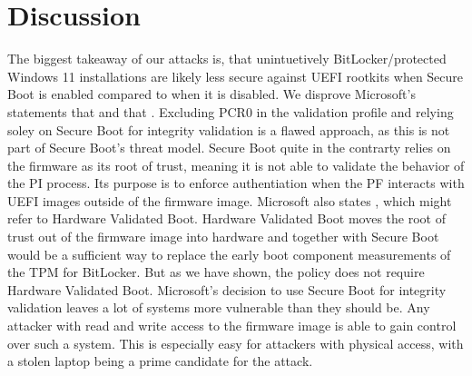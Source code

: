 


\chapter{Discussion}

The biggest takeaway of our attacks is, that unintuetively BitLocker\-/protected Windows 11 installations are likely less secure against \ac{UEFI} rootkits when Secure Boot is enabled compared to when it is disabled.
We disprove Microsoft's statements that  and that .
Excluding \ac{PCR}0 in the validation profile and relying soley on Secure Boot for integrity validation is a flawed approach, as this is not part of Secure Boot's threat model.
Secure Boot quite in the contrarty relies on the firmware as its root of trust, meaning it is not able to validate the behavior of the \ac{PI} process.
Its purpose is to enforce authentiation when the \ac{PF} interacts with \ac{UEFI} images outside of the firmware image.
Microsoft also states , which might refer to Hardware Validated Boot.
Hardware Validated Boot moves the root of trust out of the firmware image into hardware and together with Secure Boot would be a sufficient way to replace the early boot component measurements of the \ac{TPM} for BitLocker.
But as we have shown, the policy does not require Hardware Validated Boot.
Microsoft's decision to use Secure Boot for integrity validation leaves a lot of systems more vulnerable than they should be.
Any attacker with read and write access to the firmware image is able to gain control over such a system.
This is especially easy for attackers with physical access, with a stolen laptop being a prime candidate for the attack.
